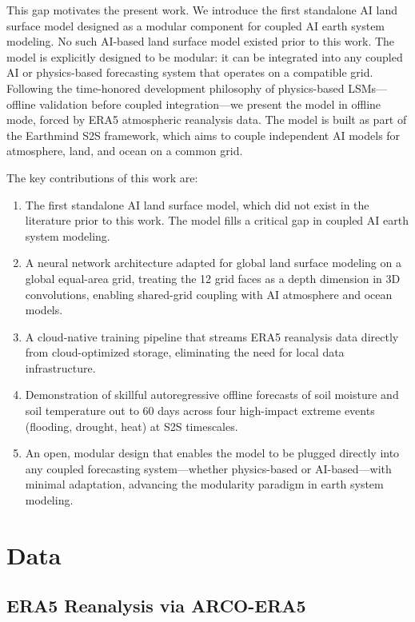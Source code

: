 \documentclass[11pt]{article}
\begin{document}
This gap motivates the present work. We introduce the first standalone AI land surface model designed as a modular component for coupled AI earth system modeling. No such AI-based land surface model existed prior to this work. The model is explicitly designed to be modular: it can be integrated into any coupled AI or physics-based forecasting system that operates on a compatible grid. Following the time-honored development philosophy of physics-based LSMs---offline validation before coupled integration---we present the model in offline mode, forced by ERA5 atmospheric reanalysis data. The model is built as part of the Earthmind S2S framework, which aims to couple independent AI models for atmosphere, land, and ocean on a common grid.

The key contributions of this work are:
\begin{enumerate}
    \item The first standalone AI land surface model, which did not exist in the literature prior to this work. The model fills a critical gap in coupled AI earth system modeling.
    \item A neural network architecture adapted for global land surface modeling on a global equal-area grid, treating the 12 grid faces as a depth dimension in 3D convolutions, enabling shared-grid coupling with AI atmosphere and ocean models.
    \item A cloud-native training pipeline that streams ERA5 reanalysis data directly from cloud-optimized storage, eliminating the need for local data infrastructure.
    \item Demonstration of skillful autoregressive offline forecasts of soil moisture and soil temperature out to 60 days across four high-impact extreme events (flooding, drought, heat) at S2S timescales.
    \item An open, modular design that enables the model to be plugged directly into any coupled forecasting system---whether physics-based or AI-based---with minimal adaptation, advancing the modularity paradigm in earth system modeling.
\end{enumerate}

\section{Data}
\label{sec:data}

\subsection{ERA5 Reanalysis via ARCO-ERA5}
\end{document}
